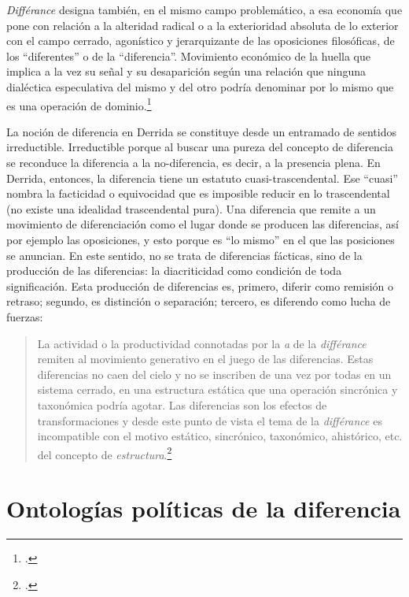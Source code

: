 \emph{Différance} designa también, en el mismo campo problemático, a esa economía  que pone con relación a la alteridad radical o a la exterioridad absoluta de lo exterior con el campo cerrado, agonístico y jerarquizante de las oposiciones filosóficas, de los \enquote{diferentes} o de la \enquote{diferencia}. Movimiento económico de la huella que implica a la vez su señal y su desaparición  según una relación que ninguna dialéctica especulativa del mismo y del otro podría denominar por lo mismo que es una operación de dominio.\footcite[37]{@6988-DERRIDA1997}

La noción de diferencia en Derrida se constituye desde un entramado de sentidos irreductible. Irreductible porque al buscar una pureza del concepto de diferencia se reconduce la diferencia a la no-diferencia, es decir, a la presencia plena. En Derrida, entonces, la diferencia tiene un estatuto cuasi-trascendental. Ese \enquote{cuasi} nombra la facticidad o equivocidad que es imposible reducir en lo trascendental (no existe una idealidad trascendental pura). Una diferencia que remite a un movimiento de diferenciación como el lugar donde se producen las diferencias, así por ejemplo las oposiciones, y esto porque es \enquote{lo mismo} en el que las posiciones se anuncian. En este sentido, no se trata de diferencias fácticas, sino de la producción de las diferencias: la diacriticidad como condición de toda significación. Esta producción de diferencias es, primero, diferir como remisión o retraso; segundo, es distinción o separación; tercero, es diferendo como lucha de fuerzas:

\begin{quote}
La actividad o la productividad connotadas por la \emph{a} de la \emph{différance} remiten al movimiento generativo en el juego de las diferencias. Estas diferencias no caen del cielo y no se inscriben de una vez por todas en un sistema cerrado, en una estructura estática que una operación sincrónica y taxonómica podría agotar. Las diferencias son los efectos de transformaciones y desde este punto de vista el tema de la \emph{différance} es incompatible con el motivo estático, sincrónico, taxonómico, ahistórico, etc. del concepto de \emph{estructura}.\footcite[37]{@6988-DERRIDA1997}
\end{quote}

\section{Ontologías políticas de la diferencia}

